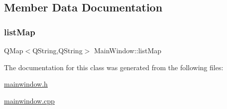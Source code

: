 \subsection{Member Data Documentation}
\mbox{\label{class_main_window_a2db0ce2c505362b3401a6243f6c8e5d4}} 
\subsubsection{\texorpdfstring{listMap}{listMap}}
{\footnotesize\ttfamily Q\+Map$<$Q\+String,Q\+String$>$ Main\+Window\+::list\+Map}



The documentation for this class was generated from the following files\+:\begin{DoxyCompactItemize}
\item 
\mbox{\hyperlink{mainwindow_8h}{mainwindow.\+h}}\item 
\mbox{\hyperlink{mainwindow_8cpp}{mainwindow.\+cpp}}\end{DoxyCompactItemize}
